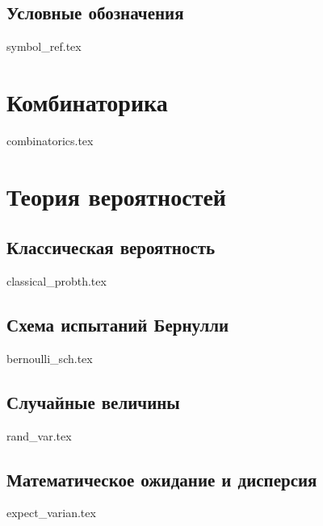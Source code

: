 \documentclass{book}
\theoremstyle{mydef}
\theoremstyle{myth}
\begin{document}

\tableofcontents
 
\newpage

\section{Условные обозначения}

{symbol_ref.tex}

\chapter{Комбинаторика}

{combinatorics.tex}

\chapter{Теория вероятностей}

\section{Классическая вероятность}

{classical_probth.tex}

\section{Схема испытаний Бернулли}

{bernoulli_sch.tex}

\section{Случайные величины}\label{sec:rand_var}

{rand_var.tex}

\section{Математическое ожидание и дисперсия}

{expect_varian.tex}
\end{document}
